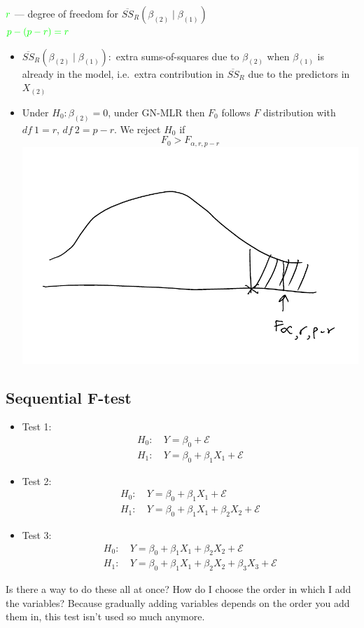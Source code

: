 \documentclass[12 pt]{article}
\begin{document}
$\textcolor{green}{r}$ --- degree of freedom for $\overline{SS}_R(\beta_{(2)} \mid
\beta_{(1)})$
\\ $\textcolor{green}{p - (p-r) = r}$
\begin{itemize}
\item $\overline{SS}_{R}(\beta_{(2)} \mid \beta_{(1)}):$ extra
  sums-of-squares due to $\beta_{(2)}$ when $\beta_{(1)}$ is already
  in the model, i.e.\ extra contribution in $\overline{SS}_R$ due to
  the predictors in $X_{(2)}$
\item Under $H_0: \beta_{(2)} = 0$, under GN-MLR then $F_0$ follows
  $F$ distribution with $df\ 1 = r$, $df\ 2 = p - r$. We reject $H_0$
  if
  $$F_0 > F_{\alpha, r, p -r}$$
  \includegraphics[width=.4\textwidth]{28.pdf}
\end{itemize}
\subsection{Sequential F-test}
\begin{itemize}
\item Test 1:
  \begin{align*}
    H_0: \ & Y = \beta_0 + \mathcal{E}
    \\ H_1: \ & Y = \beta_0 + \beta_1 X_1 + \mathcal{E}
  \end{align*}
\item Test 2:
  \begin{align*}
    H_0: \ & Y = \beta_0 + \beta_1 X_1 + \mathcal{E}
    \\ H_1: \ & Y = \beta_0 + \beta_1 X_1 + \beta_2 X_2 + \mathcal{E}
  \end{align*}
\item Test 3:
  \begin{align*}
    H_0: \ & Y = \beta_0+ \beta_1 X_1 + \beta_2 X_2 + \mathcal{E}
    \\ H_1: \ & Y = \beta_0 + \beta_1 X_1 + \beta_2 X_2 + \beta_3 X_3 + \mathcal{E}
  \end{align*}
\end{itemize}
Is there a way to do these all at once? How do I choose the order in
which I add the variables? Because gradually adding variables depends
on the order you add them in, this test isn't used so much anymore.
\end{document}
